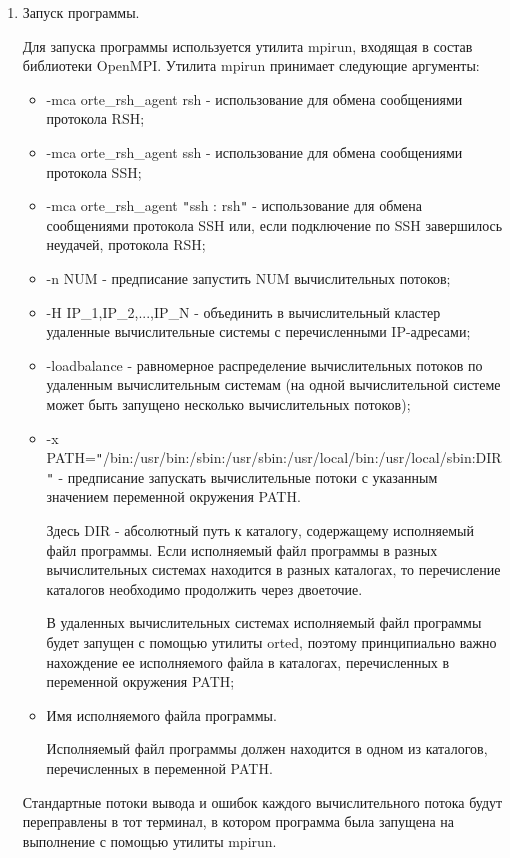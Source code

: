 \begin{enumerate}
\begin{itemize}
	\end{itemize}

	\item Запуск программы.

	Для запуска программы используется утилита mpirun, входящая в состав библиотеки OpenMPI. Утилита mpirun принимает следующие аргументы:

	\begin{itemize}

		\item -mca orte\_rsh\_agent rsh - использование для обмена сообщениями протокола RSH;
		\item -mca orte\_rsh\_agent ssh - использование для обмена сообщениями протокола SSH;
		\item -mca orte\_rsh\_agent \verb|"|ssh : rsh\verb|"| - использование для обмена сообщениями протокола SSH или, если подключение по SSH завершилось неудачей, протокола RSH;
		\item -n NUM - предписание запустить NUM вычислительных потоков;
		\item -H IP\_1,IP\_2,...,IP\_N - объединить в вычислительный кластер удаленные вычислительные системы с перечисленными IP-адресами;
		\item -loadbalance - равномерное распределение вычислительных потоков по удаленным вычислительным системам (на одной вычислительной системе может быть запущено несколько вычислительных потоков);
		\item -x PATH=\verb|"|/bin:/usr/bin:/sbin:/usr/sbin:/usr/local/bin:/usr/local/sbin:DIR\verb|"| - предписание запускать вычислительные потоки с указанным значением переменной окружения PATH.

		Здесь DIR - абсолютный путь к каталогу, содержащему исполняемый файл программы. Если исполняемый файл программы в разных вычислительных системах находится в разных каталогах, то перечисление каталогов необходимо продолжить через двоеточие.

		В удаленных вычислительных системах исполняемый файл программы будет запущен с помощью утилиты orted, поэтому принципиально важно нахождение ее исполняемого файла в каталогах, перечисленных в переменной окружения PATH;

		\item Имя исполняемого файла программы.

		Исполняемый файл программы должен находится в одном из каталогов, перечисленных в переменной PATH.

	\end{itemize}

	Стандартные потоки вывода и ошибок каждого вычислительного потока будут переправлены в тот терминал, в котором программа была запущена на выполнение с помощью утилиты mpirun.

\end{enumerate}

